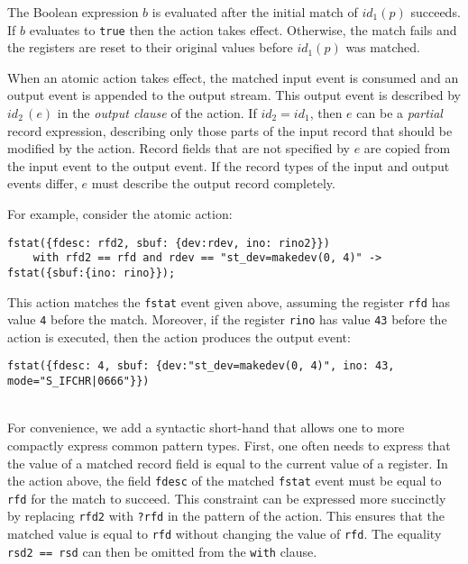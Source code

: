 The Boolean expression $b$ is evaluated after the initial match of $\mathit{id}_1(p)$ succeeds. If $b$ evaluates to \lstinline+true+ then the action takes effect. Otherwise, the match fails and the registers are reset to their original values before $\mathit{id}_1(p)$ was matched.

When an atomic action takes effect, the matched input event is consumed and an output event is appended to the output stream. This output event is described by $\mathit{id}_2\,(e)$ in the \emph{output clause} of the action. If $\mathit{id}_2=\mathit{id}_1$, then $e$ can be a \emph{partial} record expression, describing only those parts of the input record that should be modified by the action. Record fields that are not specified by $e$ are copied from the input event to the output event. If the record types of the input and output events differ, $e$ must describe the output record completely.

For example, consider the atomic action:
\begin{lstlisting}[numbers=none,xleftmargin=0em,gobble=2,basicstyle=\footnotesize\ttfamily]
  fstat({fdesc: rfd2, sbuf: {dev:rdev, ino: rino2}})
    with rfd2 == rfd and rdev == "st_dev=makedev(0, 4)" -> fstat({sbuf:{ino: rino}});
\end{lstlisting}
This action matches the \lstinline+fstat+ event given above, assuming the register \lstinline+rfd+ has value \lstinline+4+ before the match. Moreover, if the register \lstinline+rino+ has value \lstinline+43+ before the action is executed, then the action produces the output event:
\\[.3em]
\begin{adjustbox}{max width=\textwidth}
\begin{lstlisting}[numbers=none,xleftmargin=0em,gobble=2]
  fstat({fdesc: 4, sbuf: {dev:"st_dev=makedev(0, 4)", ino: 43, mode="S_IFCHR|0666"}})
  \end{lstlisting}
\end{adjustbox}\\[.5em]
For convenience, we add a syntactic short-hand that allows one to more compactly express common pattern types. First, one often needs to express that the value of a matched record field is equal to the current value of a register. In the action above, the field \lstinline+fdesc+ of the matched \lstinline+fstat+ event must be equal to \lstinline+rfd+ for the match to succeed. This constraint can be expressed more succinctly by replacing \lstinline+rfd2+ with \lstinline+?rfd+ in the pattern of the action. This ensures that the matched value is equal to \lstinline+rfd+ without changing the value of \lstinline+rfd+. The equality \lstinline+rsd2 == rsd+ can then be omitted from the \lstinline+with+ clause.

